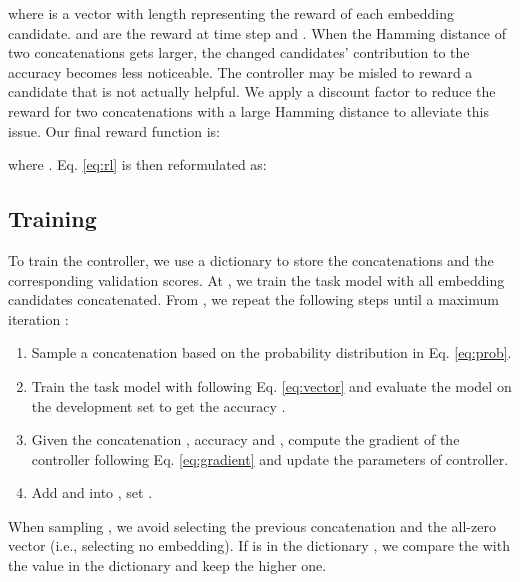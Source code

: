 \documentclass[11pt,a4paper]{article}
\begin{document}
where  is a vector with length  representing the reward of each embedding candidate.  and  are the reward at time step  and . 
When the Hamming distance of two concatenations  gets larger, the changed candidates' contribution to the accuracy becomes less noticeable. The controller may be misled to reward a candidate that is not actually helpful.
We apply a discount factor to reduce the reward for two concatenations with a large Hamming distance to alleviate this issue.
Our final reward function is:

where . Eq. \ref{eq:rl} is then reformulated as:
 

\subsection{Training}
To train the controller, we use a dictionary  to store the concatenations and the corresponding validation scores. At , we train the task model with all embedding candidates concatenated. From , we repeat the following steps until a maximum iteration :
\begin{enumerate}[leftmargin=*]
    \item Sample a concatenation  based on the probability distribution in Eq. \ref{eq:prob}.
    \item Train the task model with  following Eq. \ref{eq:vector} and evaluate the model on the development set to get the accuracy .
    \item Given the concatenation , accuracy  and , compute the gradient of the controller following Eq. \ref{eq:gradient} and update the parameters of controller.
    \item Add  and  into , set .
\end{enumerate}
When sampling , we avoid selecting the previous concatenation  and the all-zero vector (i.e., selecting no embedding). If  is in the dictionary , we compare the  with the value in the dictionary and keep the higher one.
\end{document}
